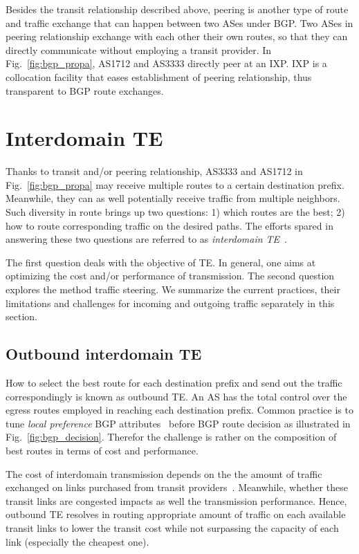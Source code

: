 Besides the transit relationship described above, peering is another type of route and traffic exchange that can happen between two ASes under BGP. Two ASes in peering relationship exchange with each other their own routes, so that they can directly communicate without employing a transit provider.
In Fig.~\ref{fig:bgp_propa}, AS1712 and AS3333 directly peer at an \ac{IXP}.
\ac{IXP} is a collocation facility that eases establishment of peering relationship, thus transparent to BGP route exchanges.

\section{Interdomain TE}
Thanks to transit and/or peering relationship, AS3333 and AS1712 in Fig.~\ref{fig:bgp_propa} may receive multiple routes to a certain destination prefix. Meanwhile, they can as well potentially receive traffic from multiple neighbors.
Such diversity in route brings up two questions: 1) which routes are the best; 2) how to route corresponding traffic on the desired paths.
The efforts spared in answering these two questions are referred to as \textit{interdomain \ac{TE}}~\cite{Quoitin2004a,Quoitin2003,Feamster2003}.

The first question deals with the objective of \ac{TE}. In general, one aims at optimizing the cost and/or performance of transmission.
The second question explores the method traffic steering.
We summarize the current practices, their limitations and challenges for incoming and outgoing traffic separately in this section.

\subsection{Outbound interdomain TE}
How to select the best route for each destination prefix and send out the traffic correspondingly is known as outbound TE. 
An AS has the total control over the egress routes employed in reaching each destination prefix. Common practice is to tune \textit{local preference} BGP attributes~\cite{Wang2008} before BGP route decision as illustrated in Fig.~\ref{fig:bgp_decision}. 
Therefor the challenge is rather on the composition of best routes in terms of cost and performance.

The cost of interdomain transmission depends on the the amount of traffic exchanged on links purchased from transit providers~\cite{drpeering-95th}.
Meanwhile, whether these transit links are congested impacts as well the transmission performance.
Hence, outbound TE resolves in routing appropriate amount of traffic on each available transit links to lower the transit cost while not surpassing the capacity of each link (especially the cheapest one).

